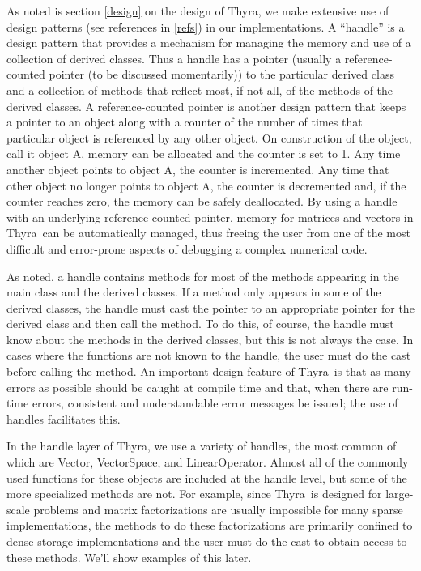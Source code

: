 \documentclass[12pt]{article}
\newcommand{\thyra}{{\sf Thyra}}
\renewcommand{\vector}{{\sf Vector}}
\newcommand{\vectorSpace}{{\sf VectorSpace}}
\newcommand{\linearOp}{{\sf LinearOperator}}
\begin{document}
As noted is section \ref{design} on the design of \thyra, we make
extensive use of design patterns (see references in \ref{refs}) in our
implementations. 
A ``handle'' is a design pattern that provides a mechanism for
managing the memory and use of a collection of derived classes.  Thus
a handle has a pointer (usually a reference-counted pointer (to be
discussed momentarily)) to the particular derived class and a
collection of methods that reflect most, if not all, of the methods of
the derived classes.  A reference-counted pointer is another design
pattern that keeps a pointer to an object along with a counter of the
number of times that particular object is referenced by any other
object.  On construction of the object, call it object A, memory can
be allocated and the counter is set to 1.  Any time another object
points to object A, the counter is incremented.  Any time that other
object no longer points to object A, the counter is decremented and,
if the counter reaches zero, the memory can be safely deallocated. By
using a handle with an underlying reference-counted pointer, memory
for matrices and vectors in \thyra\ can be automatically managed, thus
freeing the user from one of the most difficult and error-prone
aspects of debugging a complex numerical code.

As noted, a handle contains methods for most of the methods appearing
in the main class and the derived classes.  If a method only appears
in some of the derived classes, the handle must cast the pointer to an
appropriate pointer for the derived class and then call the method.
To do this, of course, the handle must know about the methods in the
derived classes, but this is not always the case.  In cases where the
functions are not known to the handle, the
user must do the cast before calling the method.  An important design
feature of \thyra\ is that as many errors as possible should be caught
at compile time and that, when there are run-time errors, consistent
and understandable error 
messages be issued; the use of handles 
facilitates this. 

In the handle layer of \thyra, we use a variety of handles, the most
common of which are  \vector,
\vectorSpace, and \linearOp.  Almost all of the commonly used functions
for these objects are included at the handle level, but some of the
more specialized methods are not.  For example, since \thyra\ is
designed for large-scale problems and matrix factorizations are
usually impossible for many sparse implementations, the methods to do
these factorizations are primarily confined to dense storage
implementations and the user must do the cast to obtain access to
these methods.  We'll show examples of this later.
\end{document}
